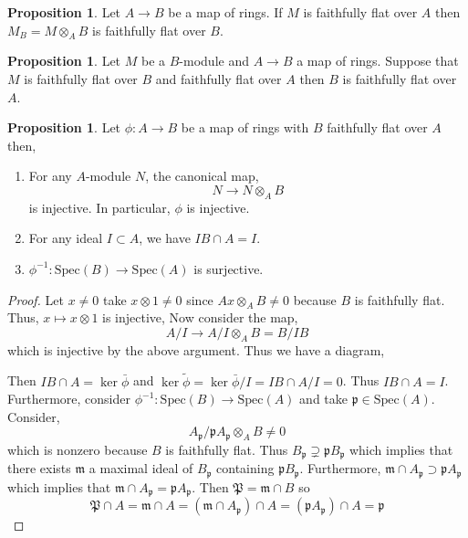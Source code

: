 \documentclass[12pt]{article}
\newcommand{\spec}[1]{\mathrm{Spec}\left( #1 \right)}
\newcommand{\p}{\mathfrak{p}}
\newcommand{\m}{\mathfrak{m}}
\theoremstyle{remark}
\theoremstyle{definition}
\newtheorem{proposition}[theorem]{Proposition}
\begin{document}
\begin{proposition}
Let $A \to B$ be a map of rings. If $M$ is faithfully flat over $A$ then $M_B = M \otimes_A B$ is faithfully flat over $B$. 
\end{proposition}

\begin{proposition}
Let $M$ be a $B$-module and $A \to B$ a map of rings. Suppose that $M$ is faithfully flat over $B$ and faithfully flat over $A$ then $B$ is faithfully flat over $A$. 
\end{proposition}

\begin{proposition}
Let $\phi: A \to B$ be a map of rings with $B$ faithfully flat over $A$ then,
\begin{enumerate}
\item For any $A$-module $N$, the canonical map,
\[ N \to N \otimes_A B \]
is injective. In particular, $\phi$ is injective.
\item For any ideal $I \subset A$, we have $I B \cap A = I$.
\item $\phi^{-1} : \spec{B} \to \spec{A}$ is surjective. 
\end{enumerate} 
\end{proposition}

\begin{proof}
Let $x \neq 0$ take $x \otimes 1 \neq 0$ since $A x \otimes_A B \neq 0$ because $B$ is faithfully flat. Thus, $x \mapsto x \otimes 1$ is injective, Now consider the map,
\[ A / I \to A / I \otimes_A B = B / IB \]
which is injective by the above argument. Thus we have a diagram,
\begin{center}
\end{center}
Then $IB \cap A = \ker{ \bar{\phi}}$ and $\ker{\tilde{\phi}} = \ker{\bar{\phi}} / I = IB \cap A / I = 0$. Thus $I B \cap A = I$. 
Furthermore, consider $\phi^{-1} : \spec{B} \to \spec{A}$ and take $\p \in \spec{A}$. Consider,
\[ A_\p / \p A_\p \otimes_A B \neq 0 \]
which is nonzero because $B$ is faithfully flat. Thus $B_\p \supsetneq \p B_\p$ which implies that there exists $\m$ a maximal ideal of $B_\p$ containing $\p B_\p$. Furthermore, $\m \cap A_\p \supset \p A_\p$ which implies that $\m \cap A_\p = \p A_\p$. Then $\mathfrak{P} = \m \cap B$ so 
\[ \mathfrak{P} \cap A = \m \cap A = (\m \cap A_\p) \cap A = (\p A_\p) \cap A = \p \]
\end{proof}
\end{document}
